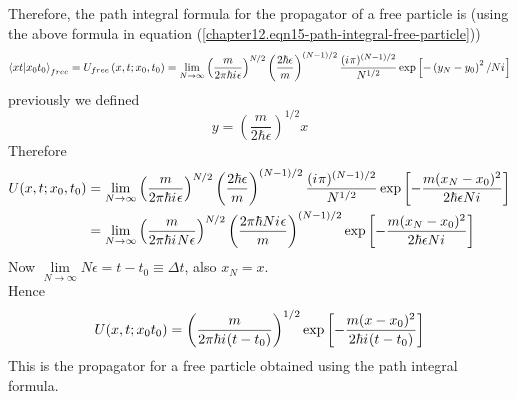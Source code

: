 	Therefore, the path integral formula for the propagator of a free particle is (using the above formula in equation (\ref{chapter12.eqn15-path-integral-free-particle}))
	\begin{align}
		\braket{x t}{x_0 t_0}_{free} = U_{free}\left(x, t; x_0, t_0\right) = \lim\limits_{N\rightarrow \infty} \left(\frac{m}{2\pi \hbar {i\mkern1mu} \epsilon}\right)^{N/2} \left(\frac{2\hbar\epsilon}{m}\right)^{(N-1)/2}  \frac{({i\mkern1mu} \pi)^{(N-1)/2}}{N^{1/2}} \exp\left[-\left(y_N - y_0\right)^2 / N{i\mkern1mu}
		\right]
	\end{align}
	previously we defined
	\begin{equation}
		y = \left(\frac{m}{2\hbar \epsilon}\right)^{1/2} x
	\end{equation}
	Therefore
	\begin{align*}
		U(x, t; x_0, t_0) 
		&= \lim\limits_{N\rightarrow \infty} \left(\frac{m}{2\pi\hbar{i\mkern1mu}\epsilon}\right)^{N/2} \left(\frac{2\hbar \epsilon}{m}\right)^{(N-1)/2} \frac{({i\mkern1mu} \pi)^{(N-1)/2}}{N^{1/2}} \exp \left[-\frac{m(x_N - x_0)^2}{2\hbar \epsilon N {i\mkern1mu}}\right] \\
		&= \lim\limits_{N\rightarrow \infty} \left(\frac{m}{2\pi\hbar{i\mkern1mu} N \epsilon}\right)^{N/2} \left(\frac{2\pi\hbar N {i\mkern1mu} \epsilon}{m}\right)^{(N-1)/2} \exp \left[-\frac{m(x_N - x_0)^2}{2\hbar \epsilon N {i\mkern1mu}}\right]
	\end{align*}
	Now $\lim\limits_{N\rightarrow \infty} N\epsilon = t-t_0 \equiv \Delta t$,
	also $x_N = x$.\\
	
	Hence
	\begin{equation}
		U(x,t; x_0 t_0) = \left(\frac{m}{2\pi \hbar {i\mkern1mu} (t-t_0)}\right)^{1/2} \exp\left[-\frac{m(x-x_0)^2}{2\hbar{i\mkern1mu} (t-t_0)}\right]
		\label{chapter12.eqn18-path-integral-free-particle}
	\end{equation}
	This is the propagator for a free particle obtained using the path integral formula.
	
